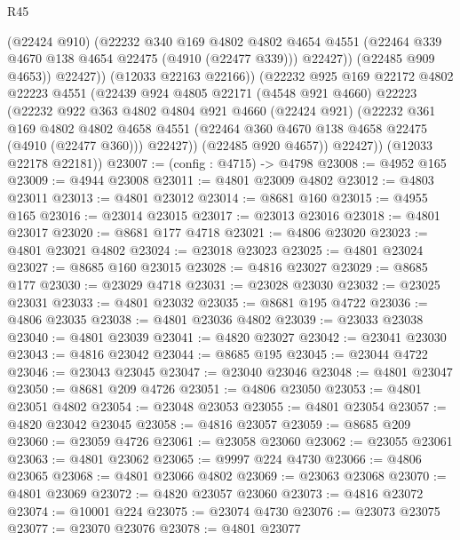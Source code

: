 \begin{lexlean}{R45}
\begin{coremodule}
                  (@22424 @910)
                  (@22232
                    @340
                    @169
                    @4802
                    @4802
                    @4654
                    @4551
                    (@22464 @339 @4670 @138 @4654 @22475 (@4910 (@22477 @339)))
                    @22427))
                (@22485 @909 @4653))
              @22427))
          (@12033 @22163 @22166))
        (@22232
          @925
          @169
          @22172
          @4802
          @22223
          @4551
          (@22439
            @924
            @4805
            @22171
            (@4548 @921 @4660)
            @22223
            (@22232
              @922
              @363
              @4802
              @4804
              @921
              @4660
              (@22424 @921)
              (@22232
                @361
                @169
                @4802
                @4802
                @4658
                @4551
                (@22464 @360 @4670 @138 @4658 @22475 (@4910 (@22477 @360)))
                @22427))
            (@22485 @920 @4657))
          @22427))
      (@12033 @22178 @22181))
@23007 := (config : @4715) -> @4798
@23008 := @4952 @165
@23009 := @4944 @23008
@23011 := @4801 @23009 @4802
@23012 := @4803 @23011
@23013 := @4801 @23012
@23014 := @8681 @160
@23015 := @4955 @165
@23016 := @23014 @23015
@23017 := @23013 @23016
@23018 := @4801 @23017
@23020 := @8681 @177 @4718
@23021 := @4806 @23020
@23023 := @4801 @23021 @4802
@23024 := @23018 @23023
@23025 := @4801 @23024
@23027 := @8685 @160 @23015
@23028 := @4816 @23027
@23029 := @8685 @177
@23030 := @23029 @4718
@23031 := @23028 @23030
@23032 := @23025 @23031
@23033 := @4801 @23032
@23035 := @8681 @195 @4722
@23036 := @4806 @23035
@23038 := @4801 @23036 @4802
@23039 := @23033 @23038
@23040 := @4801 @23039
@23041 := @4820 @23027
@23042 := @23041 @23030
@23043 := @4816 @23042
@23044 := @8685 @195
@23045 := @23044 @4722
@23046 := @23043 @23045
@23047 := @23040 @23046
@23048 := @4801 @23047
@23050 := @8681 @209 @4726
@23051 := @4806 @23050
@23053 := @4801 @23051 @4802
@23054 := @23048 @23053
@23055 := @4801 @23054
@23057 := @4820 @23042 @23045
@23058 := @4816 @23057
@23059 := @8685 @209
@23060 := @23059 @4726
@23061 := @23058 @23060
@23062 := @23055 @23061
@23063 := @4801 @23062
@23065 := @9997 @224 @4730
@23066 := @4806 @23065
@23068 := @4801 @23066 @4802
@23069 := @23063 @23068
@23070 := @4801 @23069
@23072 := @4820 @23057 @23060
@23073 := @4816 @23072
@23074 := @10001 @224
@23075 := @23074 @4730
@23076 := @23073 @23075
@23077 := @23070 @23076
@23078 := @4801 @23077

\end{coremodule}
\end{lexlean}
